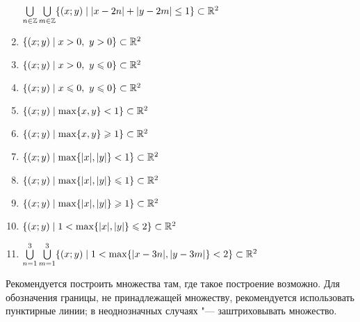 \begin{enumerate}
		$\bigcup\limits_{n\in\mathbb{Z}}\bigcup\limits_{m\in\mathbb{Z}}\{(x;y) \mid |x-2n| + |y-2m| \le 1\}\subset\mathbb{R}^2$
	\item
		$\{(x;y) \mid x>0,\ y>0\}\subset\R^2$
	\item
		$\{(x;y) \mid x>0,\ y\leq0\}\subset\R^2$
	\item
		$\{(x;y) \mid x\leq0,\ y\leq0\}\subset\R^2$
	\item
		$\{(x;y) \mid \max\{x,y\} < 1\}\subset\mathbb{R}^2$
	\item
		$\{(x;y) \mid \max\{x,y\} \geqslant 1\}\subset\mathbb{R}^2$
	\item
		$\{(x;y) \mid \max\{|x|,|y|\} < 1\}\subset\mathbb{R}^2$
	\item
		$\{(x;y) \mid \max\{|x|,|y|\} \leqslant 1\}\subset\mathbb{R}^2$
	\item
		$\{(x;y) \mid \max\{|x|,|y|\} \geqslant 1\}\subset\mathbb{R}^2$
	\item
		$\{(x;y) \mid 1 < \max\{|x|,|y|\} \leqslant 2\}\subset\mathbb{R}^2$
	\item
		$\bigcup\limits_{n=1}^3\bigcup\limits_{m=1}^3 \{(x;y) \mid 1 < \max\{|x-3n|,|y-3m|\} < 2\}\subset\mathbb{R}^2$
\end{enumerate}

Рекомендуется построить множества там, где такое построение возможно.
Для обозначения границы, не принадлежащей множеству, рекомендуется использовать пунктирные линии;
в неоднозначных случаях "--- заштриховывать множество.
